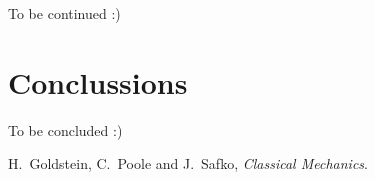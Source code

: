 \documentclass[a4paper]{article}
\begin{document}
	To be continued :)
	
	\section{Conclussions}
	To be concluded :)

	\newpage
	\begin{thebibliography}{9}

	H.~Goldstein, C.~Poole and J.~Safko, \textit{Classical Mechanics}.

	\end{thebibliography}
\end{document}

